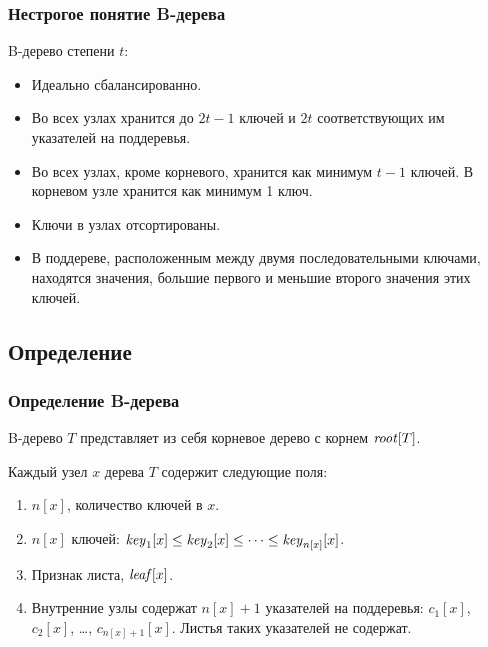 \documentclass[hyperref={unicode=true}]{beamer}
\begin{document}
\frame
{
  \frametitle{Нестрогое понятие B-дерева}
  
  B-дерево степени $t$:
  \begin{itemize}
    \item Идеально сбалансированно. 
    \item Во всех узлах хранится до $2t-1$ ключей и $2t$
      соответствующих им указателей на поддеревья. 
    \item Во всех узлах, кроме корневого, хранится как минимум $t-1$
      ключей. В корневом узле хранится как минимум 1 ключ. 
    \item Ключи в узлах отсортированы. 
    \item В поддереве, расположенным между двумя последовательными
      ключами, находятся значения, большие первого и меньшие второго
      значения этих ключей. 
  \end{itemize}
}

\subsection{Определение}
\frame
{
  \frametitle{Определение B-дерева}
  B-дерево $T$ представляет из себя корневое дерево с корнем
  $\id{root}[T]$.

  Каждый узел $x$ дерева $T$ содержит следующие поля:
  \begin{enumerate}
    \item $n[x]$, количество ключей в $x$.
    \item $n[x]$ ключей: $\id{key}_1[x] \leq \id{key}_2[x] \leq \cdots \leq
      \id{key}_{n[x]}[x]$.
      \item Признак листа, $\id{leaf}[x]$.
      \item Внутренние узлы содержат $n[x]+1$ указателей на поддеревья: $c_1[x]$, $c_2[x]$,
        \ldots , $c_{n[x]+1}[x]$. Листья таких указателей не
        содержат. 
  \end{enumerate}
}

\end{document}

